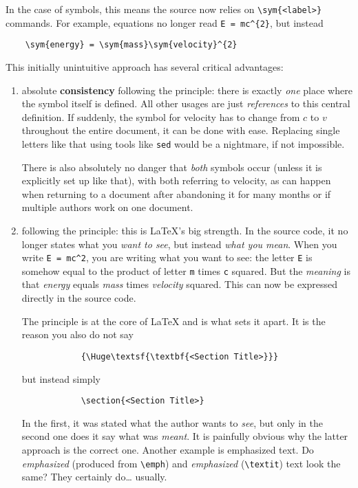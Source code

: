 In the case of symbols, this means the source now relies on \verb|\sym{<label>}|
commands.
For example, equations no longer read \verb|E = mc^{2}|, but instead
\begin{verbatim}
    \sym{energy} = \sym{mass}\sym{velocity}^{2}
\end{verbatim}
This initially unintuitive approach has several critical advantages:
\begin{enumerate}
    \item absolute \textbf{consistency} following the 
        principle:
        there is exactly \emph{one} place where the symbol itself is defined.
        All other usages are just \emph{references} to this central definition.
        If suddenly, the symbol for velocity has to change from \(c\) to \(v\)
        throughout the entire document, it can be done with ease.
        Replacing single letters like that using tools like \texttt{sed} would be a
        nightmare, if not impossible.

        There is also absolutely no danger that \emph{both} symbols occur (unless
        it is explicitly set up like that), with both referring to velocity,
        as can happen when returning to a document after abandoning it for many months
        or if multiple authors work on one document.
    \item following the \textbf{} principle:
        this is \LaTeX{}'s big strength.
        In the source code, it no longer states what you \emph{want to see}, but
        instead \emph{what you mean}.
        When you write \verb|E = mc^2|, you are writing what you want to see:
        the letter \texttt{E} is somehow equal to the product of letter \texttt{m}
        times \texttt{c} squared.
        But the \emph{meaning} is that \emph{energy} equals \emph{mass} times
        \emph{velocity} squared.
        This can now be expressed directly in the source code.

        The  principle is at the core of \LaTeX{}
        and is what sets it apart.
        It is the reason you also do not say
        \begin{verbatim}
            {\Huge\textsf{\textbf{<Section Title>}}}
        \end{verbatim}
        but instead simply
        \begin{verbatim}
            \section{<Section Title>}
        \end{verbatim}
        In the first, it was stated what the author wants to \emph{see}, but only
        in the second one does it say what was \emph{meant}.
        It is painfully obvious why the latter approach is the correct one.
        Another example is emphasized text.
        Do \emph{emphasized} (produced from \verb|\emph|) and \textit{emphasized}
        (\verb|\textit|) text look the same?
        They certainly do\dots{} usually.


\end{enumerate}
